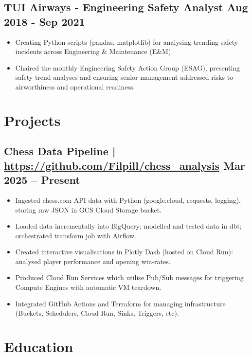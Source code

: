 \documentclass[a4paper, 10pt]{article}
\begin{document}
\subsection*{\textbf{TUI Airways - Engineering Safety Analyst} \hfill  Aug 2018 - Sep 2021}
\begin{itemize}[noitemsep]
  \item Creating Python scripts (pandas, matplotlib) for analysing trending safety incidents across Engineering \& Maintenance (E\&M).
  \item Chaired the monthly Engineering Safety Action Group (ESAG), presenting safety trend analyses and ensuring senior management addressed risks to airworthiness and operational readiness.
\end{itemize}
\vspace{-5.5mm}

\section*{Projects}
\vspace{-2.5mm}

\subsection*{\textbf{Chess Data Pipeline} | \url{https://github.com/Filpill/chess_analysis} \hfill  Mar 2025 – Present}
\begin{itemize}[noitemsep]
  \item Ingested chess.com API data with Python (google.cloud, requests, logging), storing raw JSON in GCS Cloud Storage bucket.
  \item Loaded data incrementally into BigQuery; modelled and tested data in dbt; orchestrated transform job with Airflow.
  \item Created interactive visualisations in Plotly Dash (hosted on Cloud Run): analysed player performance and opening win-rates.
  \item Produced Cloud Run Services which utilise Pub/Sub messages for triggering Compute Engines with automatic VM teardown.
  \item Integrated GitHub Actions and Terraform for managing infrastructure (Buckets, Schedulers, Cloud Run, Sinks, Triggers, etc).
\end{itemize}
\vspace{-5.5mm}

\section*{Education}
\vspace{-3.5mm}
\end{document}
